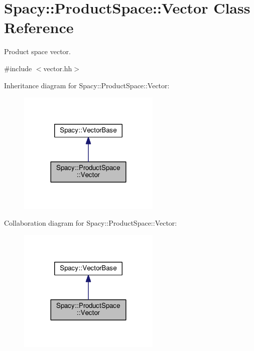 \hypertarget{classSpacy_1_1ProductSpace_1_1Vector}{}\section{Spacy\+:\+:Product\+Space\+:\+:Vector Class Reference}
\label{classSpacy_1_1ProductSpace_1_1Vector}


Product space vector.  




{\ttfamily \#include $<$vector.\+hh$>$}



Inheritance diagram for Spacy\+:\+:Product\+Space\+:\+:Vector\+:
\nopagebreak
\begin{figure}[H]
\begin{center}
\leavevmode
\includegraphics[width=192pt]{classSpacy_1_1ProductSpace_1_1Vector__inherit__graph}
\end{center}
\end{figure}


Collaboration diagram for Spacy\+:\+:Product\+Space\+:\+:Vector\+:
\nopagebreak
\begin{figure}[H]
\begin{center}
\leavevmode
\includegraphics[width=192pt]{classSpacy_1_1ProductSpace_1_1Vector__coll__graph}
\end{center}
\end{figure}
